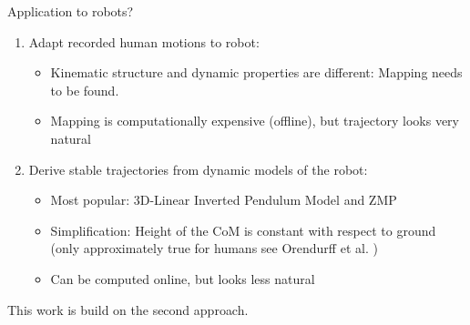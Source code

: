 \begin{frame}{Application to robots?}

\begin{enumerate}
\def\labelenumi{\arabic{enumi}.}
\item
  Adapt recorded human motions to robot:

  \begin{itemize}
  \item
    Kinematic structure and dynamic properties are different: Mapping
    needs to be found.
  \item
    Mapping is computationally expensive (offline), but trajectory looks
    very natural
  \end{itemize}
\item
  Derive stable trajectories from dynamic models of the robot:

  \begin{itemize}
  \item
    Most popular: 3D-Linear Inverted Pendulum Model and ZMP
  \item
    Simplification: Height of the CoM is constant with respect to ground
    (only approximately true for humans see Orendurff et al.
    \cite{orendurff2004effect})
  \item
    Can be computed online, but looks less natural
  \end{itemize}
\end{enumerate}

This work is build on the second approach.

\end{frame}


